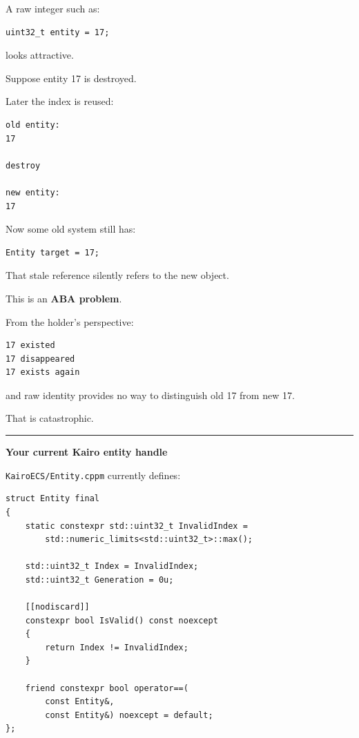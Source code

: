 A raw integer such as:

\begin{verbatim}
uint32_t entity = 17;
\end{verbatim}

looks attractive.

Suppose entity 17 is destroyed.

Later the index is reused:

\begin{verbatim}
old entity:
17

destroy

new entity:
17
\end{verbatim}

Now some old system still has:

\begin{verbatim}
Entity target = 17;
\end{verbatim}

That stale reference silently refers to the new object.

This is an \textbf{ABA problem}.

From the holder's perspective:

\begin{verbatim}
17 existed
17 disappeared
17 exists again
\end{verbatim}

and raw identity provides no way to distinguish old 17 from new 17.

That is catastrophic.

\begin{center}\rule{0.5\linewidth}{0.5pt}\end{center}

\textbf{Your current Kairo entity handle}

\texttt{KairoECS/Entity.cppm} currently defines:

\begin{verbatim}
struct Entity final
{
    static constexpr std::uint32_t InvalidIndex =
        std::numeric_limits<std::uint32_t>::max();

    std::uint32_t Index = InvalidIndex;
    std::uint32_t Generation = 0u;

    [[nodiscard]]
    constexpr bool IsValid() const noexcept
    {
        return Index != InvalidIndex;
    }

    friend constexpr bool operator==(
        const Entity&,
        const Entity&) noexcept = default;
};
\end{verbatim}


